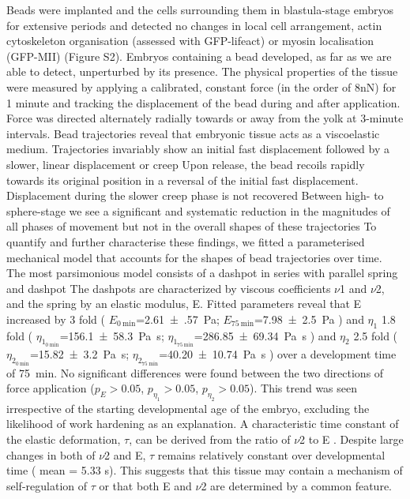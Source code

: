 Beads were implanted and the cells surrounding them in blastula-stage embryos for extensive periods and detected no changes in local cell arrangement, actin cytoskeleton organisation (assessed with GFP-lifeact) or myosin localisation (GFP-MII) (Figure S2).
Embryos containing a bead developed, as far as we are able to detect, unperturbed by its presence.
The physical properties of the tissue were measured by applying a calibrated, constant force (in the order of 8nN) for 1 minute and tracking the displacement of the bead during and after application.
Force was directed alternately radially towards or away from the yolk at 3-minute intervals.
Bead trajectories reveal that embryonic tissue acts as a viscoelastic medium.
Trajectories invariably show an initial fast displacement followed by a slower, linear displacement or creep %
Upon release, the bead recoils rapidly towards its original position in a reversal of the initial fast displacement.
Displacement during the slower creep phase is not recovered %
Between high- to sphere-stage we see a significant and systematic reduction in the magnitudes of all phases of movement but not in the overall shapes of these trajectories  %
To quantify and further characterise these findings, we fitted a parameterised mechanical model that accounts for the shapes of bead trajectories over time.
The most parsimonious model consists of a dashpot in series with parallel spring and dashpot  %
The dashpots are characterized by viscous coefficients $\nu$1 and $\nu$2, and the spring by an elastic modulus, E.
Fitted parameters reveal that E increased by 3 fold
(
$E_{\SI{0}{\minute}}$=\SI{2.61(57)}{\pascal};
$E_{\SI{75}{\minute}}$=\SI{7.98(250)}{\pascal}
)
and $\eta_1$ 1.8 fold
(
$\eta_{1_{\SI{0}{\minute}}}$=\SI{156.1(583)}{\pascal\second};
$\eta_{1_{\SI{75}{\minute}}}$=\SI{286.85(6934)}{\pascal\second}
)
and $\eta_2$ 2.5 fold
(
$\eta_{2_{\SI{0}{\minute}}}$=\SI{15.82(320)}{\pascal\second};
$\eta_{2_{\SI{75}{\minute}}}$=\SI{40.20(1074)}{\pascal\second}
)
over a development time of \SI{75}{\minute}.
No significant differences were found between the two directions of force application ($p_E > 0.05$, $p_{\eta_1} > 0.05$, $p_{\eta_2} > 0.05$).
This trend was seen irrespective of the starting developmental age of the embryo, excluding the likelihood of work hardening as an explanation.
A characteristic time constant of the elastic deformation, $\tau$, can be derived from the ratio of $\nu$2 to E .
Despite large changes in both of $\nu$2 and E, $\tau$ remains relatively constant over developmental time (%
mean = 5.33 s).
This suggests that this tissue may contain a mechanism of self-regulation of $\tau$ or that both E and $\nu$2 are determined by a common feature.

